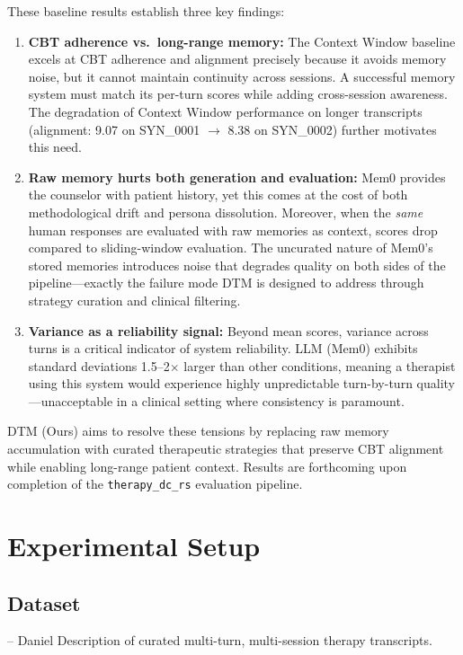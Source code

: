 \documentclass{article} %
\begin{document}
These baseline results establish three key findings:

\begin{enumerate}
    \item \textbf{CBT adherence vs.\ long-range memory:} The Context Window baseline excels at CBT adherence and alignment precisely because it avoids memory noise, but it cannot maintain continuity across sessions. A successful memory system must match its per-turn scores while adding cross-session awareness. The degradation of Context Window performance on longer transcripts (alignment: 9.07 on SYN\_0001 $\to$ 8.38 on SYN\_0002) further motivates this need.

    \item \textbf{Raw memory hurts both generation and evaluation:} Mem0 provides the counselor with patient history, yet this comes at the cost of both methodological drift and persona dissolution. Moreover, when the \emph{same} human responses are evaluated with raw memories as context, scores drop compared to sliding-window evaluation. The uncurated nature of Mem0's stored memories introduces noise that degrades quality on both sides of the pipeline---exactly the failure mode DTM is designed to address through strategy curation and clinical filtering.

    \item \textbf{Variance as a reliability signal:} Beyond mean scores, variance across turns is a critical indicator of system reliability. LLM (Mem0) exhibits standard deviations 1.5--2$\times$ larger than other conditions, meaning a therapist using this system would experience highly unpredictable turn-by-turn quality---unacceptable in a clinical setting where consistency is paramount.
\end{enumerate}

DTM (Ours) aims to resolve these tensions by replacing raw memory accumulation with curated therapeutic strategies that preserve CBT alignment while enabling long-range patient context. Results are forthcoming upon completion of the \texttt{therapy\_dc\_rs} evaluation pipeline.

\section{Experimental Setup}

\subsection{Dataset} -- Daniel
Description of curated multi-turn, multi-session therapy transcripts.
\end{document}
